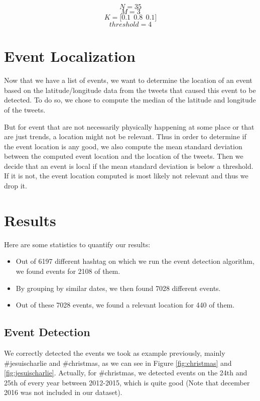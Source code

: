 \documentclass[11pt]{article}
\begin{document}
$$N = 35 $$
$$M = 3$$
$$K = \big[ 0.1\ \ 0.8\ \ 0.1 \big]$$
$$threshold = 4$$

\section{Event Localization}
Now that we have a list of events, we want to determine the location of an event based on the latitude/longitude data from the tweets that caused this event to be detected. To do so, we chose to compute the median of the latitude and longitude of the tweets. 

But for event that are not necessarily physically happening at some place or that are just trends, a location might not be relevant. Thus in order to determine if the event location is any good, we also compute the mean standard deviation between the computed event location and the location of the tweets. Then we decide that an event is local if the mean standard deviation is below a threshold. If it is not, the event location computed is most likely not relevant and thus we drop it.

\section{Results}
Here are some statistics to quantify our results:

\begin{itemize}
  \item Out of 6197 different hashtag on which we run the event detection algorithm, we found events for 2108 of them.
  \item By grouping by similar dates, we then found 7028 different events.
  \item Out of these 7028 events, we found a relevant location for 440 of them.
\end{itemize}

\subsection{Event Detection}
We correctly detected the events we took as example previously, mainly \#jesuischarlie and \#christmas, as we can see in Figure \ref{fig:christmas} and \ref{fig:jesuischarlie}. Actually, for \#christmas, we detected events on the 24th and 25th of every year between 2012-2015, which is quite good (Note that december 2016 was not included in our dataset).
\end{document}
